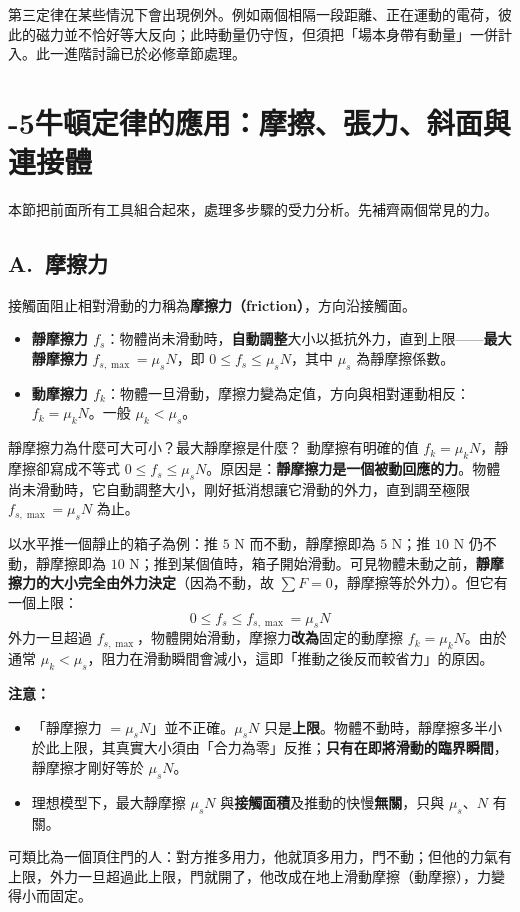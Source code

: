 \documentclass[11pt]{article}
\begin{document}
第三定律在某些情況下會出現例外。例如兩個相隔一段距離、正在運動的電荷，彼此的磁力並不恰好等大反向；此時動量仍守恆，但須把「場本身帶有動量」一併計入。此一進階討論已於必修章節處理。

\section*{-5\quad 牛頓定律的應用：摩擦、張力、斜面與連接體}

本節把前面所有工具組合起來，處理多步驟的受力分析。先補齊兩個常見的力。

\subsection*{\sffamily A.\ 摩擦力}

接觸面阻止相對滑動的力稱為\textbf{摩擦力（friction）}，方向沿接觸面。
\begin{itemize}\setlength{\itemsep}{1pt}
\item \textbf{靜摩擦力 $f_s$}：物體尚未滑動時，\textbf{自動調整}大小以抵抗外力，直到上限——\textbf{最大靜摩擦力} $f_{s,\max}=\mu_s N$，即 $0 \le f_s \le \mu_s N$，其中 $\mu_s$ 為靜摩擦係數。
\item \textbf{動摩擦力 $f_k$}：物體一旦滑動，摩擦力變為定值，方向與相對運動相反：$f_k = \mu_k N$。一般 $\mu_k < \mu_s$。
\end{itemize}

\begin{補充框}{靜摩擦力為什麼可大可小？最大靜摩擦是什麼？}
動摩擦有明確的值 $f_k=\mu_k N$，靜摩擦卻寫成不等式 $0\le f_s\le\mu_s N$。原因是：\textbf{靜摩擦力是一個被動回應的力}。物體尚未滑動時，它自動調整大小，剛好抵消想讓它滑動的外力，直到調至極限 $f_{s,\max}=\mu_s N$ 為止。

以水平推一個靜止的箱子為例：推 $5$ N 而不動，靜摩擦即為 $5$ N；推 $10$ N 仍不動，靜摩擦即為 $10$ N；推到某個值時，箱子開始滑動。可見物體未動之前，\textbf{靜摩擦力的大小完全由外力決定}（因為不動，故 $\sum F=0$，靜摩擦等於外力）。但它有一個上限：
$$\boxed{\;0 \le f_s \le f_{s,\max} = \mu_s N\;}$$
外力一旦超過 $f_{s,\max}$，物體開始滑動，摩擦力\textbf{改為}固定的動摩擦 $f_k=\mu_k N$。由於通常 $\mu_k<\mu_s$，阻力在滑動瞬間會減小，這即「推動之後反而較省力」的原因。

\textbf{注意：}
\begin{itemize}\setlength{\itemsep}{1pt}
\item 「靜摩擦力 $=\mu_s N$」並不正確。$\mu_s N$ 只是\textbf{上限}。物體不動時，靜摩擦多半小於此上限，其真實大小須由「合力為零」反推；\textbf{只有在即將滑動的臨界瞬間}，靜摩擦才剛好等於 $\mu_s N$。
\item 理想模型下，最大靜摩擦 $\mu_s N$ 與\textbf{接觸面積}及推動的快慢\textbf{無關}，只與 $\mu_s$、$N$ 有關。
\end{itemize}

可類比為一個頂住門的人：對方推多用力，他就頂多用力，門不動；但他的力氣有上限，外力一旦超過此上限，門就開了，他改成在地上滑動摩擦（動摩擦），力變得小而固定。
\end{補充框}
\end{document}
